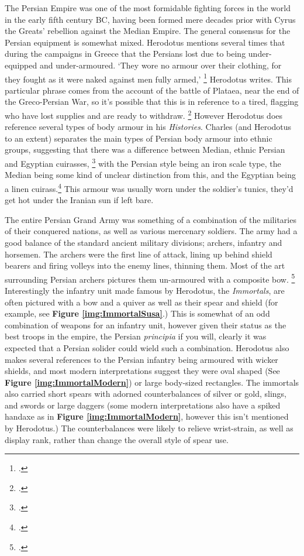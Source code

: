 \documentclass[twoside, a4paper, 12pt]{article}
\begin{document}
The Persian Empire was one of the most formidable fighting forces in the world
in the early fifth century BC, having been formed mere decades prior with
Cyrus the Greats' rebellion against the Median Empire. 
The general consensus for the Persian equipment is somewhat mixed.
Herodotus mentions several times that during the campaigns in Greece that
the Persians lost due to being under-equipped and under-armoured.
`They wore no armour over their clothing, for they fought as it were
naked against men fully armed,' \footcite[Book 9.63.2]{herodotus_1920}
Herodotus writes. This particular phrase comes from the account of the battle
of Plataea, near the end of the Greco-Persian War, so it's possible that this
is in reference to a tired, flagging who have lost supplies and are ready
to withdraw. \footcite[267]{charles_bodyarmour_2012}
However Herodotus does reference several types of body armour in his \emph{Histories}.
Charles (and Herodotus to an extent) separates the main types of Persian body armour
into ethnic groups, suggesting that there was a difference between Median,
ethnic Persian and Egyptian cuirasses,
\footcite[Book 1.135]{herodotus_1920}
with the Persian style being an iron
scale type, the Median being some kind of unclear distinction from this, and
the Egyptian being a linen cuirass.\footcite[260-2]{charles_bodyarmour_2012}
This armour was usually worn under the soldier's tunics, they'd 
get hot under the Iranian sun if left bare.

\par\vspace{1em}

The entire Persian Grand Army was something of a combination of the militaries
of their conquered nations, as well as various mercenary soldiers. The army had
a good balance of the standard ancient military divisions; archers, infantry
and horsemen. The archers were the first line of attack, lining up behind
shield bearers and firing volleys into the enemy lines, thinning them. Most
of the art surrounding Persian archers pictures them un-armoured with a composite
bow. \footcite{dhwty_2015}
Interestingly the infantry unit made famous by Herodotus, the \emph{Immortals},
are often pictured with a bow and a quiver as well as their spear and shield
(for example, see \textbf{Figure \ref{img:ImmortalSusa}}.)
This is somewhat of an odd combination of weapons for an infantry unit,
however given their status as the best troops in the empire, the Persian
\emph{principia} if you will, clearly it was expected that a Persian solider
could wield such a combination. Herodotus also makes several references to
the Persian infantry being armoured with wicker shields, and most modern 
interpretations suggest they were oval shaped
(See \textbf{Figure \ref{img:ImmortalModern}}) or large body-sized rectangles.
The immortals also carried short spears with adorned counterbalances of silver
or gold, slings, and swords or large daggers (some modern interpretations also
have a spiked handaxe as in \textbf{Figure \ref{img:ImmortalModern}}, however
this isn't mentioned by Herodotus.) The counterbalances were likely to relieve
wrist-strain, as well as display rank, rather than change the overall style of
spear use.
\end{document}
